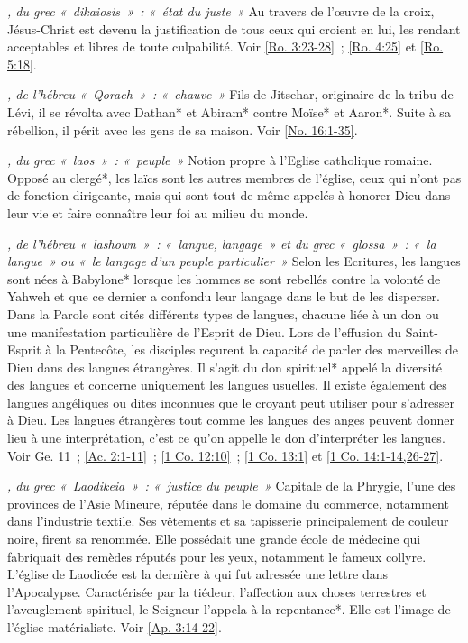 \begin{multicols}{2}
\textit{, du grec «~dikaiosis~»~: «~état du juste~»}\newline
Au travers de l'œuvre de la croix, Jésus-Christ est devenu la justification de tous ceux qui croient en lui, les rendant acceptables et libres de toute culpabilité. Voir \vref{Ro. 3:23-28}~; \vref{Ro. 4:25} et \vref{Ro. 5:18}.

\textit{, de l'hébreu «~Qorach~»~: «~chauve~»}\newline
Fils de Jitsehar, originaire de la tribu de Lévi, il se révolta avec Dathan* et Abiram* contre Moïse* et Aaron*. Suite à sa rébellion, il périt avec les gens de sa maison. Voir \vref{No. 16:1-35}.

\textit{, du grec «~laos~»~: «~peuple~»}\newline
Notion propre à l'Eglise catholique romaine. Opposé au clergé*, les laïcs sont les autres membres de l'église, ceux qui n'ont pas de fonction dirigeante, mais qui sont tout de même appelés à honorer Dieu dans leur vie et faire connaître leur foi au milieu du monde.

\textit{, de l'hébreu «~lashown~»~: «~langue, langage~» et du grec «~glossa~»~: «~la langue~» ou «~le langage d'un peuple particulier~»}\newline
Selon les Ecritures, les langues sont nées à Babylone* lorsque les hommes se sont rebellés contre la volonté de Yahweh et que ce dernier a confondu leur langage dans le but de les disperser. Dans la Parole sont cités différents types de langues, chacune liée à un don ou une manifestation particulière de l'Esprit de Dieu. Lors de l'effusion du Saint-Esprit à la Pentecôte, les disciples reçurent la capacité de parler des merveilles de Dieu dans des langues étrangères. Il s'agit du don spirituel* appelé la diversité des langues et concerne uniquement les langues usuelles. Il existe également des langues angéliques ou dites inconnues que le croyant peut utiliser pour s'adresser à Dieu. Les langues étrangères tout comme les langues des anges peuvent donner lieu à une interprétation, c'est ce qu'on appelle le don d'interpréter les langues. Voir Ge. 11~; \vref{Ac. 2:1-11}~; \vref{1 Co. 12:10}~; \vref{1 Co. 13:1} et \vref{1 Co. 14:1-14,26-27}.

\textit{, du grec «~Laodikeia~»~: «~justice du peuple~»}\newline
Capitale de la Phrygie, l'une des provinces de l'Asie Mineure, réputée dans le domaine du commerce, notamment dans l'industrie textile. Ses vêtements et sa tapisserie principalement de couleur noire, firent sa renommée. Elle possédait une grande école de médecine qui fabriquait des remèdes réputés pour les yeux, notamment le fameux collyre. L'église de Laodicée est la dernière à qui fut adressée une lettre dans l'Apocalypse. Caractérisée par la tiédeur, l'affection aux choses terrestres et l'aveuglement spirituel, le Seigneur l'appela à la repentance*. Elle est l'image de l'église matérialiste. Voir \vref{Ap. 3:14-22}.


\end{multicols}
